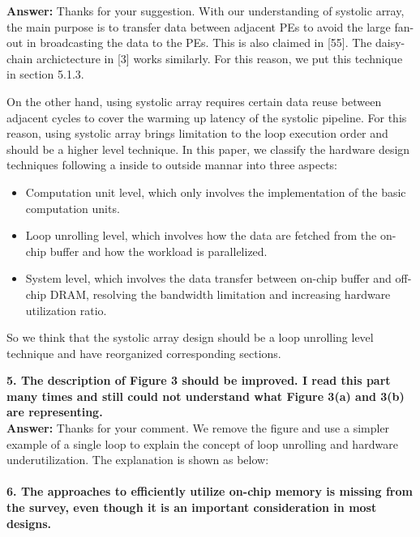 \documentclass[12pt]{paper}
\newcommand{\rev}[1]{{{\color[rgb]{0,0,1}{#1}}}}
\newcommand{\answer}[1]{\noindent\textbf{Answer:} #1}
\newcommand{\comment}[1]{\noindent\textbf{#1}\\}
\begin{document}
\answer{Thanks for your suggestion. With our understanding of systolic array, the main purpose is to transfer data between adjacent PEs to avoid the large fan-out in broadcasting the data to the PEs. This is also claimed in [55]. The daisy-chain archictecture in [3] works similarly. For this reason, we put this technique in section 5.1.3. 

On the other hand, using systolic array requires certain data reuse between adjacent cycles to cover the warming up latency of the systolic pipeline. For this reason, using systolic array brings limitation to the loop execution order and should be a higher level technique. In this paper, we classify the hardware design techniques following a inside to outside mannar into three aspects:
\begin{itemize}
    \item Computation unit level, which only involves the implementation of the basic computation units.
    \item Loop unrolling level, which involves how the data are fetched from the on-chip buffer and how the workload is parallelized.
    \item System level, which involves the data transfer between on-chip buffer and off-chip DRAM, resolving the bandwidth limitation and increasing hardware utilization ratio.
\end{itemize}

So we think that the systolic array design should be a loop unrolling level technique and have reorganized corresponding sections.
}

\comment{5.	The description of Figure 3 should be improved. I read this part many times and still could not understand what Figure 3(a) and 3(b) are representing.}

\answer{Thanks for your comment. We remove the figure and use a simpler example of a single loop to explain the concept of loop unrolling and hardware underutilization. The explanation is shown as below:\\

\rev{To parallelize the execution of the loops, we unroll the loops and parallelize the process of a certain number of iterations on hardware. The number of the parallelized iteraions on hardware is called the unroll parameter. Inappropriate unroll parameter selection may lead to serious hardware underutilization. Take a single loop as an example. Suppose the trip count of the loop is $M$ and the parallelism is $m$. The utilization ratio of the hardware is limited by $m/M\lceil M/m\rceil$. If $M$ is not divisible by $m$, then the utilization ratio is less than 1. Furthermore, in the case of NN process, the total utilization ratio will be the product of the utilization ratio along each of the loops.}}\\

\comment{6.	The approaches to efficiently utilize on-chip memory is missing from the survey, even though it is an important consideration in most designs.}
\end{document}
